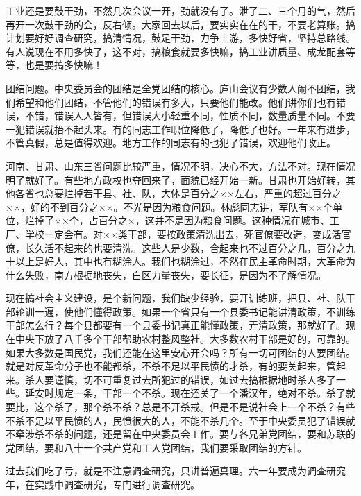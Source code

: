 工业还是要鼓干劲，不然几次会议一开，劲就没有了。泄了二、三个月的气，然后再开一次鼓干劲的会，反右倾。大家回去以后，要实实在在的干，不要老算账。搞计划要好好调查研究，搞清情况，鼓足干劲，力争上游，多快好省，坚持总路线。有人说现在不用多快了，这不对，搞粮食就要多快嘛，搞工业讲质量、成龙配套等等，也是要搞多快嘛！

团结问题。中央委员会的团结是全党团结的核心。庐山会议有少数人闹不团结，我们希望和他们团结，不管他们的错误有多大，只要他们能改。他们讲你们也有错误，不错，错误人人皆有，但错误大小轻重不同，性质不同，数量质量不同。不要一犯错误就抬不起头来。有的同志工作职位降低了，降低了也好。一年来有进步，不管真假，总是值得欢迎。地方工作的同志有的也犯了错误，欢迎他们改正。

河南、甘肃、山东三省问题比较严重，情况不明，决心不大，方法不对。现在情况明了就好了。有些地方政权也夺回来了，面貌已经开始一新。甘肃也开始好转，其他各省也总要烂掉若干县、社、队，大体是百分之××左右，严重的超过百分之××，好的不到百分之××。不光是因为粮食问题。林彪同志讲，军队有××个单位，烂掉了××个，占百分之×，这并不是因为粮食问题。这种情况在城市、工厂、学校一定会有。对××类干部，要按政策清洗出去，死官僚要改造，变成活官僚，长久活不起来的也要清洗。这些人是少数，合起来也不过百分之几，百分之九十以上是好人，其中也有糊涂人。我们也糊涂过，不然在民主革命时期，大革命为什么失败，南方根据地丧失，白区力量丧失，要长征，是因为不了解情况。

现在搞社会主义建设，是个新问题，我们缺少经验，要开训练班，把县、社、队干部轮训一遍，使他们懂得政策。如果一个省只有一个县委书记能讲清政策，不训练干部怎么行？每个县都要有一个县委书记真正能懂政策，弄清政策，那就好了。现在中央下放了八千多个干部帮助农村整风整社。大多数农村干部是好的，可靠的。如果大多数是国民党，我们还能在这里安心开会吗？所有一切可团结的人要团结。就是对反革命分子也不能都杀，不杀不足以平民愤的才杀，有的要关起来，管起来。杀人要谨慎，切不可重复过去所犯过的错误，如过去搞根据地时杀人多了一些。延安时规定一条，干部一个不杀。现在还关了一个潘汉年，绝对不杀。杀了就要比，这个杀了，那个杀不杀？总是不开杀戒。但是不是说社会上一个不杀？有些不杀不足以平民愤的人，民愤很大的人，不能不杀几个。至于中央委员犯了错误就不牵涉杀不杀的问题，还是留在中央委员会工作。要与各兄弟党团结，要和苏联的党团结，要和八十一个共产党和工人党团结，我们要采取团结的方针。

过去我们吃了亏，就是不注意调查研究，只讲普遍真理。六一年要成为调查研究年，在实践中调查研究，专门进行调查研究。
